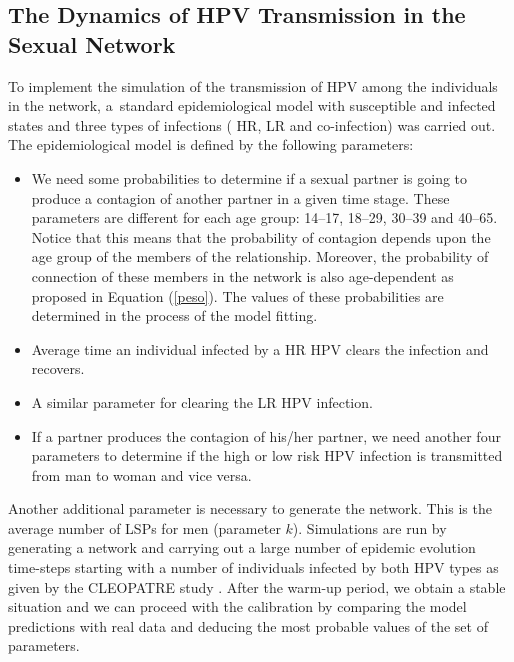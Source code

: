 \subsection{The Dynamics of HPV Transmission in the Sexual Network}

To implement the simulation of the transmission of HPV among the individuals in the network, a~standard epidemiological model with susceptible and infected states and three types of infections ( {HR, LR} and co-infection) was carried out.
The epidemiological model is defined by the following parameters:

\begin{itemize}[leftmargin=*,labelsep=5mm]
\item We need some probabilities to determine if a sexual partner is going to produce a contagion of another partner in a given time stage. These parameters are different for each age group:	
 14--17, 18--29, 30--39 and 40--65. Notice that this means that the probability of contagion depends upon the age group of the members of the relationship. Moreover, the probability of connection of these members in the network is also age-dependent
as proposed in Equation (\ref{peso}). The values of these probabilities are determined in the process of the {model} fitting.
\item Average time an individual infected by a HR HPV clears the infection and recovers.
\item A similar parameter for clearing the LR HPV infection.
\item If a partner produces the contagion of his/her partner, we need another four parameters to determine if the high or low risk HPV infection is transmitted from man to woman and vice versa. 
\end{itemize}

Another additional parameter is necessary to generate the network. This is the average number of LSPs for men (parameter $k$). Simulations are run by generating a network and carrying out a large number of epidemic evolution time-steps starting with a number of individuals infected by both HPV types as given by the CLEOPATRE study \cite{CLEOPATRE}.
After the warm-up period, we obtain a stable situation and we can proceed with the calibration by comparing the model predictions with real data and deducing the most probable values of the set of parameters.


